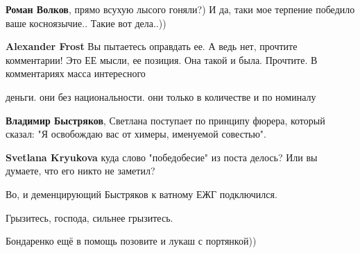 \begin{itemize}
\begin{itemize}
\textbf{Роман Волков}, прямо всухую лысого гоняли?) И да, таки мое терпение победило ваше косноязычие.. Такие вот дела..))

 
\textbf{Alexander Frost} Вы пытаетесь оправдать ее. А ведь нет, прочтите комментарии! Это ЕЕ мысли, ее позиция. Она такой и была. Прочтите. В комментариях масса интересного

 
деньги. они без национальности. они только в количестве и по номиналу

 
\textbf{Владимир Быстряков}, Светлана поступает по принципу фюрера, который сказал: "Я освобождаю вас от химеры, именуемой совестью".

 
\textbf{Svetlana Kryukova} куда слово "победобесие" из поста делось? Или вы думаете, что его никто не заметил?

 

Во, и деменцирующий Быстряков к ватному ЕЖГ подключился.

Грызитесь, господа, сильнее грызитесь.

Бондаренко ещё в помощь позовите и лукаш с портянкой))

 

\end{itemize}
\end{itemize}
